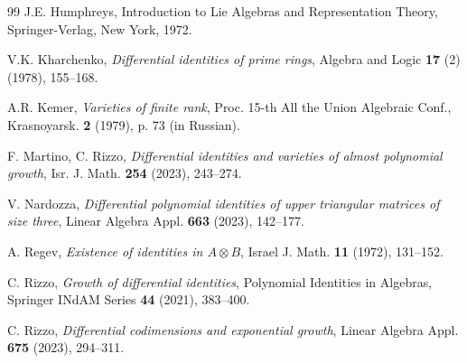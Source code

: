 \documentclass[a4paper,reqno]{amsart}
\theoremstyle{definition}
\numberwithin{equation}{section}
\numberwithin{theorem}{section}
\begin{document}
\begin{thebibliography}{99}
	 J.E. Humphreys, Introduction to Lie Algebras and Representation Theory, Springer-Verlag, New York, 1972.

        V.K. Kharchenko, {\em Differential identities of prime rings}, Algebra and Logic {\bf 17} (2) (1978), 155--168.

     A.R. Kemer, {\em Varieties of finite rank}, Proc. 15-th All the Union Algebraic Conf., Krasnoyarsk. {\bf 2} (1979), p. 73 (in Russian).



  F. Martino, C. Rizzo, {\em Differential identities and varieties of almost polynomial growth}, Isr. J. Math. {\bf 254} (2023), 243--274.


 V. Nardozza, {\em Differential polynomial identities of upper triangular matrices of size three},  Linear Algebra Appl. {\bf 663} (2023), 142--177.



 A. Regev, {\em Existence of identities in $A\otimes B$}, Israel J. Math. {\bf 11} (1972), 131--152.

 C. Rizzo, {\em Growth of differential identities}, Polynomial Identities in Algebras, Springer INdAM Series \textbf{44} (2021), 383--400.

     C. Rizzo, {\em Differential codimensions and exponential growth}, Linear Algebra Appl. {\bf 675} (2023), 294--311.


\end{thebibliography}
\end{document}
